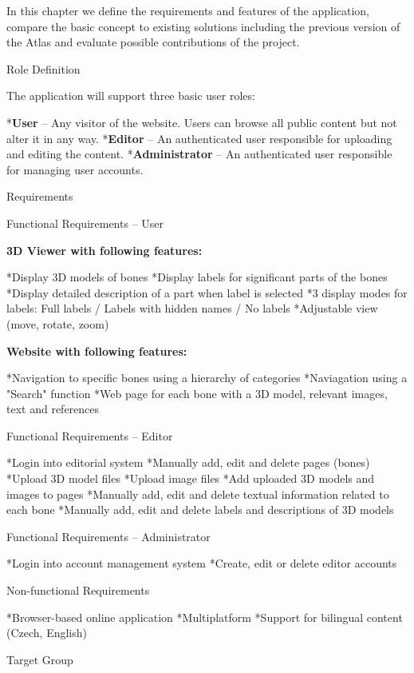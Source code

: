In this chapter we define the requirements and features of the application, compare the basic concept to existing solutions including the previous version of the Atlas and evaluate possible contributions of the project.

\sec Role Definition

The application will support three basic user roles:

\begitems
*{\bf User} -- Any visitor of the website. Users can browse all public content but not alter it in any way.
*{\bf Editor} -- An authenticated user responsible for uploading and editing the content.
*{\bf Administrator} -- An authenticated user responsible for managing user accounts.
\enditems

\sec Requirements

\secc Functional Requirements -- User

\vskip 10pt
{\bf 3D Viewer with following features:}

\begitems
*Display 3D models of bones
*Display labels for significant parts of the bones
*Display detailed description of a part when label is selected
*3 display modes for labels: Full labels / Labels with hidden names / No labels
*Adjustable view (move, rotate, zoom)
\enditems

\vskip 10pt
{\bf Website with following features:}

\begitems
*Navigation to specific bones using a hierarchy of categories
*Naviagation using a "Search" function
*Web page for each bone with a 3D model, relevant images, text and references
\enditems

\secc Functional Requirements -- Editor

\begitems
*Login into editorial system
*Manually add, edit and delete pages (bones)
*Upload 3D model files
*Upload image files
*Add uploaded 3D models and images to pages
*Manually add, edit and delete textual information related to each bone
*Manually add, edit and delete labels and descriptions of 3D models
\enditems

\secc Functional Requirements -- Administrator

\begitems
*Login into account management system
*Create, edit or delete editor accounts
\enditems

\secc Non-functional Requirements

\begitems
*Browser-based online application
*Multiplatform
*Support for bilingual content (Czech, English)
\enditems

\sec Target Group

